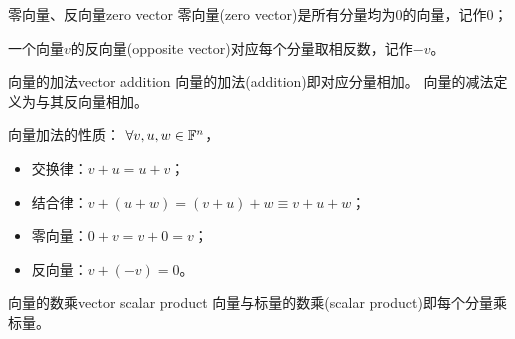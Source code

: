\begin{definition}{零向量、反向量}{zero vector}
	零向量(zero vector)是所有分量均为0的向量，记作0；
	
	一个向量$v$的反向量(opposite vector)对应每个分量取相反数，记作$-v$。
\end{definition}


\begin{definition}{向量的加法}{vector addition}
	向量的加法(addition)即对应分量相加。
	向量的减法定义为与其反向量相加。
\end{definition}

\begin{corollary}
	向量加法的性质：%
	$\forall v,u,w\in\mathbb F^n$，
    \begin{itemize}
    	\item 交换律：$v+u=u+v$；
    	\item 结合律：$v+(u+w)=(v+u)+w\equiv v+u+w$；
    	\item 零向量：$0+v=v+0=v$；
    	\item 反向量：$v+(-v)=0$。
    \end{itemize}
\end{corollary}

\begin{definition}{向量的数乘}{vector scalar product}
	向量与标量的数乘(scalar product)即每个分量乘标量。
\end{definition}

